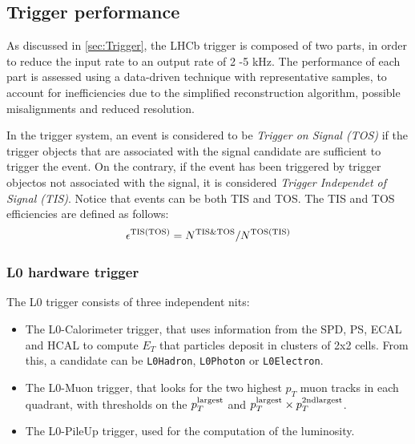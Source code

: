 \subsection{Trigger performance} %
\label{sec:TriggerPerformance}
As discussed in \ref{sec:Trigger}, the LHCb trigger is composed of two parts, in order to reduce the input rate to an output rate of 2 -5 kHz. The performance of each part is assessed using a data-driven technique with representative samples, to account for inefficiencies due to the simplified reconstruction algorithm, possible misalignments and reduced resolution. 

In the trigger system, an event is considered to be \textit{Trigger on Signal (TOS)} if the trigger objects that are associated with the signal candidate are sufficient to trigger the event. On the contrary, if the event has been triggered by trigger objectos not associated with the signal, it is considered \textit{Trigger Independet of Signal (TIS)}. Notice that events can be both TIS and TOS. The TIS and TOS efficiencies are defined as follows:
\begin{equation}
\epsilon^{\rm TIS(TOS)} = N^{\rm TIS \& TOS}/N^{\rm TOS(TIS)}
\end{equation}

\subsubsection{L0 hardware trigger}
The L0 trigger consists of three independent nits:
\begin{itemize}
\item The L0-Calorimeter trigger, that uses information from the SPD, PS, ECAL and HCAL to compute $E_T$ that particles deposit in clusters of 2x2 cells. From this, a candidate can be \texttt{L0Hadron}, \texttt{L0Photon} or \texttt{L0Electron}. 
\item The L0-Muon trigger, that looks for the two highest $p_T$ muon tracks in each quadrant, with thresholds on the $p_T^{\rm largest}$ and $p_T^{\rm largest} \times p_T^{\rm 2nd largest}$. 
\item The L0-PileUp trigger, used for the computation of the luminosity. 
\end{itemize}

